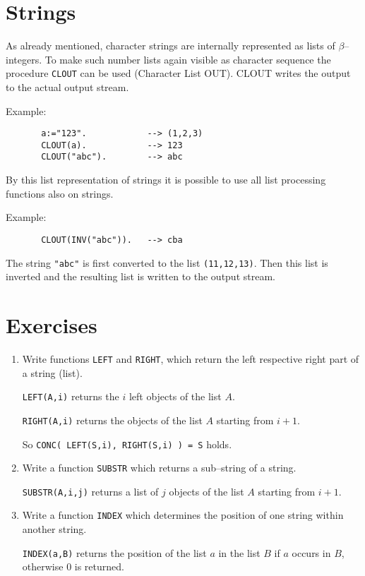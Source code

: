 \section{Strings}

As already mentioned, character strings are internally
represented as lists of $\beta$--integers.
To make such number lists again visible as character sequence 
the procedure \verb/CLOUT/ can be used 
(Character List OUT). CLOUT writes the output 
to the actual output stream. 

Example:
\begin{verbatim}
       a:="123".            --> (1,2,3)
       CLOUT(a).            --> 123
       CLOUT("abc").        --> abc
\end{verbatim}

By this list representation of strings it is possible to
use all list processing functions also on strings.

Example:
\begin{verbatim}
       CLOUT(INV("abc")).   --> cba
\end{verbatim}
The string \verb/"abc"/ is first converted to 
the list \verb/(11,12,13)/. Then this list is inverted
and the resulting list is written to the output stream.

\section{Exercises}
 
\begin{enumerate}
\item Write functions \verb/LEFT/ and \verb/RIGHT/, which
      return the left respective right part of a string (list).
      
      \verb/LEFT(A,i)/ returns the $i$ left objects of the list $A$.
      
      \verb/RIGHT(A,i)/ returns the objects of the list $A$ 
      starting from $i+1$.

      So \verb/CONC( LEFT(S,i), RIGHT(S,i) ) = S/ holds. 
\item Write a function \verb/SUBSTR/ which returns a sub--string
      of a string.

      \verb/SUBSTR(A,i,j)/ returns a list of $j$ objects of the list $A$
      starting from $i+1$.
\item Write a function \verb/INDEX/ which determines the
      position of one string within another string.

      \verb/INDEX(a,B)/ returns the position of the list $a$ in the
      list $B$ if $a$ occurs in $B$, otherwise $0$ is returned.
\end{enumerate}

